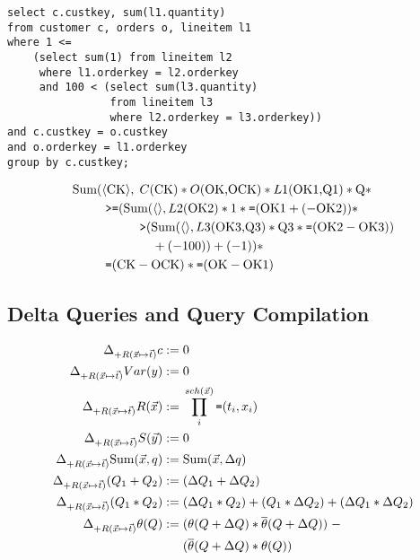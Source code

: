 \begin{verbatim}
select c.custkey, sum(l1.quantity)
from customer c, orders o, lineitem l1
where 1 <=
    (select sum(1) from lineitem l2
     where l1.orderkey = l2.orderkey
     and 100 < (select sum(l3.quantity)
                from lineitem l3
                where l2.orderkey = l3.orderkey))
and c.custkey = o.custkey
and o.orderkey = l1.orderkey
group by c.custkey;
\end{verbatim}

\begin{align*}
\mbox{Sum}(& {\langle\mbox{CK}\rangle},
  \; C(\mbox{CK}) * O(\mbox{OK,OCK}) * L1(\mbox{OK1,Q1}) * \mbox{Q} * \\
& \; \mbox{{\tt >=}}(\mbox{Sum}({\langle\rangle}, L2(\mbox{OK2}) * 1 *
     \mbox{{\tt =}}(\mbox{OK1}+(-\mbox{OK2})) * \\
& \qquad \quad
    \mbox{{\tt >}}(\mbox{Sum}({\langle\rangle}, L3(\mbox{OK3,Q3}) * \mbox{Q3} *
    \mbox{{\tt =}}(\mbox{OK2} - \mbox{OK3}))
\\ & \qquad \qquad + (-100)) + (-1)) * \\
& \; \mbox{{\tt =}}(\mbox{CK} - \mbox{OCK}) * \mbox{{\tt =}}(\mbox{OK} - \mbox{OK1})
\end{align*}

\subsection{Delta Queries and Query Compilation}

\begin{align*}
\Delta_{+R(\vec{x} \mapsto \vec{t})} c := & \; 0
\\
\Delta_{+R(\vec{x} \mapsto \vec{t})} Var(y) := & \; 0
\\
\Delta_{+R(\vec{x} \mapsto \vec{t})} R(\vec{x}) := & \;
\prod_i^{sch(\vec{x})} \mbox{{\tt =}}(t_i,x_i)
\\
\Delta_{+R(\vec{x} \mapsto \vec{t})} S(\vec{y}) := & \; 0
\\
\Delta_{+R(\vec{x} \mapsto \vec{t})}
\mbox{Sum}(\vec{x},q) := & \; \mbox{Sum}(\vec{x},\Delta q)
\\
\Delta_{+R(\vec{x} \mapsto \vec{t})} (Q_1 + Q_2) := & \;
(\Delta Q_1 + \Delta Q_2)
\\
\Delta_{+R(\vec{x} \mapsto \vec{t})} (Q_1 * Q_2) := & \;
(\Delta Q_1 * Q_2) +
(Q_1 * \Delta Q_2) +
(\Delta Q_1 * \Delta Q_2)
\\
\Delta_{+R(\vec{x} \mapsto \vec{t})} \theta(Q) := & \;
(\theta(Q + \Delta Q) * \overline{\theta}(Q + \Delta Q)) \; -
\\
& \; (\overline{\theta}(Q+\Delta Q) * \theta(Q))
\\
\end{align*}

